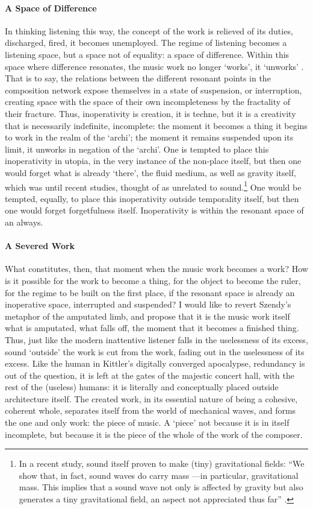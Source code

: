 \paragraph{A Space of Difference}
In thinking listening this way, the concept of the work is relieved of its duties, discharged, fired, it becomes unemployed. The regime of listening becomes a listening space, but a space not of equality: a space of difference. Within this space where difference resonates, the music work no longer `works', it `unworks' . That is to say, the relations between the different resonant points in the composition network expose themselves in a state of suspension, or interruption, creating space with the space of their own incompleteness by the fractality of their fracture. Thus, inoperativity is creation, it is techne, but it is a creativity that is necessarily indefinite, incomplete: the moment it becomes a thing it begins to work in the realm of the `archi'; the moment it remains suspended upon its limit, it unworks in negation of the `archi'. One is tempted to place this inoperativity in utopia, in the very instance of the non-place itself, but then one would forget what is already `there', the fluid medium, as well as gravity itself, which was until recent studies, thought of as unrelated to sound.\footnote{In a recent study, sound itself proven to make (tiny) gravitational fields: ``We show that, in fact, sound waves do carry mass ---in particular, gravitational mass. This implies that a sound wave not only is affected by gravity but also generates a tiny gravitational field, an aspect not appreciated thus far'' \parencite{PhysRevLett.122.084501}.} One would be tempted, equally, to place this inoperativity outside temporality itself, but then one would forget forgetfulness itself. Inoperativity is within the resonant space of an always.

\paragraph{A Severed Work}
What constitutes, then, that moment when the music work becomes a work? How is it possible for the work to become a thing, for the object to become the ruler, for the regime to be built on the first place, if the resonant space is already an inoperative space, interrupted and suspended? I would like to revert Szendy's metaphor of the amputated limb, and propose that it is the music work itself what is amputated, what falls off, the moment that it becomes a finished thing. Thus, just like the modern inattentive listener falls in the uselessness of its excess, sound `outside' the work is cut from the work, fading out in the uselessness of its excess. Like the human in Kittler's digitally converged apocalypse, redundancy is out of the question, it is left at the gates of the majestic concert hall, with the rest of the (useless) humans: it is literally and conceptually placed outside architecture itself. The created work, in its essential nature of being a cohesive, coherent whole, separates itself from the world of mechanical waves, and forms the one and only work: the piece of music. A `piece' not because it is in itself incomplete, but because it is the piece of the whole of the work of the composer.

